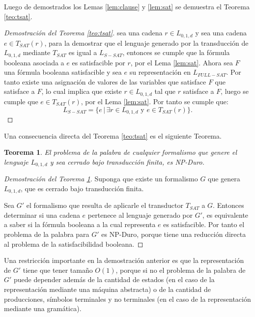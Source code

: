 \documentclass[12pt]{article}
\newtheorem{theorem}{Teorema}
\begin{document}
Luego de demostrados los Lemas \ref{lem:clause} y \ref{lem:sat} se demuestra el Teorema \ref{teo:tsat}.

\begin{proof}[Demostración del Teorema \ref{teo:tsat}]
    sea una cadena $r \in L_{0,1,d}$ y sea una cadena $e\in T_{SAT}(r)$, para la demostrar que el 
    lenguaje generado por la transducción de $L_{0,1,d}$ mediante $T_{SAT}$ es igual a $L_{S-SAT}$, 
    entonces se cumple que la fórmula booleana asociada a $e$ es satisfacible por $r$, por el Lema 
    \ref{lem:sat}. Ahora sea $F$ una fórmula booleana satisfacible y sea $e$ su representación en $L_{FULL-SAT}$.
    Por tanto existe una asignación de valores de las variables que satisface $F$ que satisface a $F$, lo cual implica que existe 
    $r\in L_{0,1,d}$ tal que $r$ satisface a $F$, luego se cumple que $e\in T_{SAT}(r)$, por el Lema \ref{lem:sat}. 
    Por tanto se cumple que:
    $$L_{S-SAT} = \{e\,|\,\exists r \in L_{0,1,d} \text{ y } e \in T_{SAT}(r) \}.$$
\end{proof}

Una consecuencia directa del Teorema \ref{teo:tsat} es el siguiente Teorema. 

\begin{theorem}
    \label{teo:gnp-hard}
    El problema de la palabra de cualquier formalismo que genere el lenguaje $L_{0,1,d}$ y sea cerrado bajo transducción finita, es NP-Duro.
\end{theorem}

\begin{proof}[Demostración del Teorema \ref{teo:gnp-hard}]
    Suponga que existe un formalismo $G$ que genera $L_{0,1,d}$, que es cerrado bajo transducción finita.
    
    Sea $G'$ el formalismo que resulta de aplicarle el transductor $T_{SAT}$ a $G$. Entonces determinar si una cadena $e$ pertenece al lenguaje generado por $G'$, es equivalente a saber si la fórmula booleana a la cual representa $e$ es satisfacible. Por tanto el problema de la palabra para $G'$ es NP-Duro, porque tiene una reducción directa al problema de la satisfacibilidad booleana.
\end{proof}

Una restricción importante en la demostración anterior es que la representación de $G'$ tiene que tener tamaño $O(1)$,
porque si no el problema de la palabra de $G'$ puede depender además de la cantidad de estados (en el caso de
la representación mediante una máquina abstracta) o de la cantidad de producciones, símbolos terminales y no terminales
(en el caso de la representación mediante una  gramática).
\end{document}
